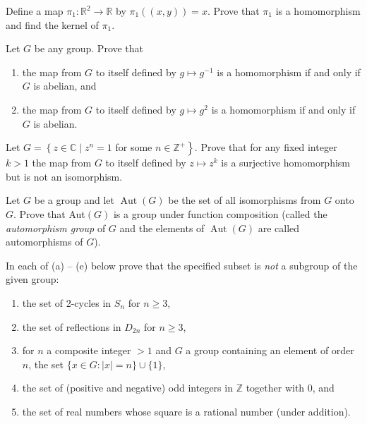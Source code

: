 \documentclass[
    11pt,a4paper,
]{exam}
\begin{document}
\begin{questions}
    \question
    Define a map \(\pi_1: \mathbb{R}^2 \rightarrow \mathbb{R}\) by \(\pi_1((x, y))=x\). Prove that \(\pi_1\) is a homomorphism and find the kernel of \(\pi_1\).
    
    \question
    Let \(G\) be any group. Prove that 
    \begin{enumerate}[label=(\roman*)]
        \item the map from \(G\) to itself defined by \(g \mapsto g^{-1}\) is a homomorphism if and only if \(G\) is abelian, and
        \item the map from \(G\) to itself defined by \(g \mapsto g^2\) is a homomorphism if and only if \(G\) is abelian.
    \end{enumerate}
    
    
     
    
    \question
    Let \(G=\left\{z \in \mathbb{C} \mid z^n=1\right.\) for some \(\left.n \in \mathbb{Z}^{+}\right\}\). Prove that for any fixed integer \(k>1\) the map from \(G\) to itself defined by \(z \mapsto z^k\) is a surjective homomorphism but is not an isomorphism.
    
    
    
    
    \question
    Let \(G\) be a group and let \(\operatorname{Aut}(G)\) be the set of all isomorphisms from \(G\) onto \(G\). Prove that Aut\((G)\) is a group under function composition (called the \textit{automorphism group} of \(G\) and the elements of \(\operatorname{Aut}(G)\) are called automorphisms of \(G\)).
    
    
    
    
    
    
    
    
    
    \question
    In each of (a) -- (e) below prove that the specified subset is \textit{not} a subgroup of the given group:
    \begin{enumerate}[label=(\alph*)]
        \item the set of 2-cycles in \(S_n\) for \(n \geq 3\),
        \item the set of reflections in \(D_{2 n}\) for \(n \geq 3\),
        \item for \(n\) a composite integer \(>1\) and \(G\) a group containing an element of order \(n\), the set \(\{x \in G : | x |=n\} \cup\{1\}\),
        \item the set of (positive and negative) odd integers in \(\mathbb{Z}\) together with 0, and
        \item the set of real numbers whose square is a rational number (under addition).
    \end{enumerate}
    

\end{questions}
\end{document}
